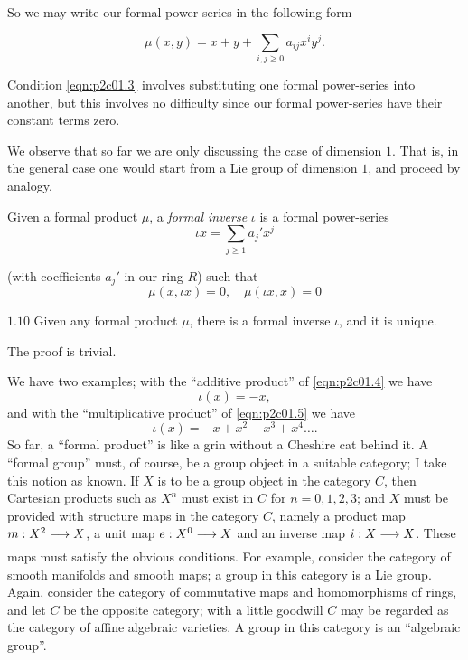 \documentclass[../main]{subfiles}
\begin{document}
So we may write our formal power-series in the following form 

\begin{equation}
\tag{1.7}
\label{eqn:p2c01.7}
\mu(x, y) = x + y + \sum_{i, j \ge 0} a_{ij} x^i y^j.
\end{equation}

Condition \eqref{eqn:p2c01.3} involves substituting one formal power-series into another, but this involves no difficulty since our formal power-series have their constant terms zero.

We observe that so far we are only discussing the case of dimension $1$. That is, in the general case one would start from a Lie group of dimension $1$, and proceed by analogy. %

Given a formal product $\mu$, a \emph{formal inverse} $\iota$ is a formal power-series
\begin{equation}
\tag{1.8}
\label{eqn:p2c01.8}
\iota x = \sum_{j \ge 1} a_j' x^j
\end{equation}

(with coefficients $a_j'$ in our ring $R$) such that 
\begin{equation}
\tag{1.9}
\label{eqn:p2c01.9}
\mu(x, \iota x) = 0, \quad \mu(\iota x, x) = 0
\end{equation}

\begin{customlemma}{$1.10$}
\label{lem:p2c01.10}
Given any formal product $\mu$, there is a formal inverse $\iota$, and it is unique.
\end{customlemma}

The proof is trivial. 

We have two examples; with the ``additive product'' of \eqref{eqn:p2c01.4} we have \[\iota(x) = -x,\] and with the ``multiplicative product'' of \eqref{eqn:p2c01.5} we have \[\iota(x) = -x + x^2 - x^3 + x^4 \ldots.\] So far, a ``formal product'' is like a grin without a Cheshire cat behind it. A ``formal group'' must, of course, be a group object in a suitable category; I take this notion as known. If $X$ is to be a group object in the category $C$, then Cartesian products such as $X^n$ must exist in $C$ for $n = 0, 1, 2, 3$; and $X$ must be provided with structure maps in the category $C$, namely a product map $m : X^2 \lar{} X$, a unit map $e : X^0 \lar{} X$ and an inverse map $i : X \lar{} X$. These maps must satisfy the obvious conditions. For example, consider the category of smooth manifolds and smooth maps; a group in this category is a Lie group. Again, consider the category of commutative maps and homomorphisms of rings, and let $C$ be the opposite category; with a little goodwill $C$ may be regarded as the category of affine algebraic varieties. A group in this category is an ``algebraic group''.\\
\end{document}
